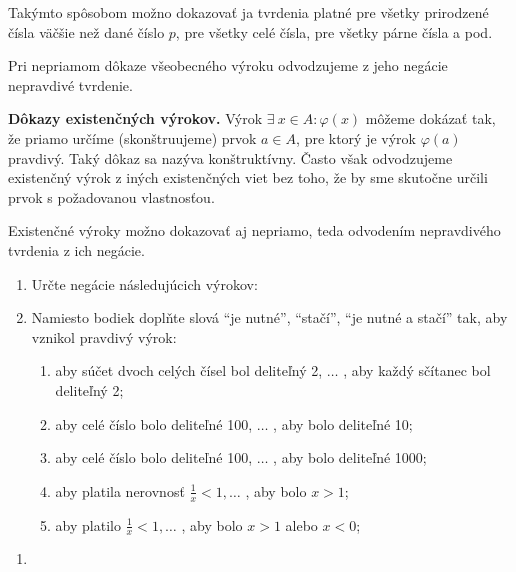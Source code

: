 Takýmto spôsobom možno dokazovať ja tvrdenia platné pre všetky prirodzené čísla
väčšie než dané číslo $p$, pre všetky celé čísla, pre všetky párne čísla a pod.

Pri nepriamom dôkaze všeobecného výroku odvodzujeme z jeho negácie nepravdivé tvrdenie.

\textbf{Dôkazy existenčných výrokov.} Výrok $\exists ~ x \in A: \varphi (x)$
môžeme dokázať tak, že priamo určíme (skonštruujeme) prvok $a \in A$, pre ktorý
je výrok $\varphi (a)$ pravdivý. Taký dôkaz sa nazýva konštruktívny. Často však
odvodzujeme existenčný výrok z iných existenčných viet bez toho, že by sme
skutočne určili prvok s požadovanou vlastnosťou.

Existenčné výroky možno dokazovať aj nepriamo, teda odvodením nepravdivého
tvrdenia z ich negácie.

\begin{enumerate}
  \item Určte negácie následujúcich výrokov:
  
  \item Namiesto bodiek doplňte slová \enquote{je nutné}, \enquote{stačí},
        \enquote{je nutné a stačí} tak, aby vznikol pravdivý výrok:
  \begin{enumerate}[label=\arabic*.]
    \item aby súčet dvoch celých čísel bol deliteľný 2, $\ldots$ , aby každý
          sčítanec bol deliteľný 2;
    \item aby celé číslo bolo deliteľné 100, $\ldots$ , aby bolo deliteľné 10;
    \item aby celé číslo bolo deliteľné 100, $\ldots$ , aby bolo deliteľné
          1000;
    \item aby platila nerovnosť $\frac{1}{x} < 1, \ldots$ , aby bolo $x > 1$;
    \item aby platilo $\frac{1}{x} < 1, \ldots$ , aby bolo $x > 1$ alebo
          $x < 0$;
  \end{enumerate}
\end{enumerate}

\begin{enumerate}
  \item {}
\end{enumerate}
